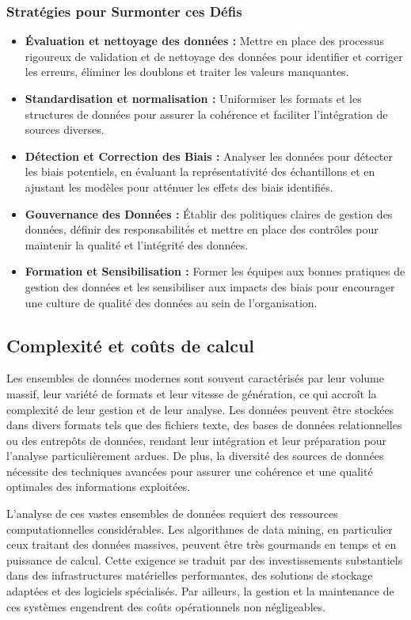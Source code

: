 \documentclass[a4paper,12pt]{article}
\begin{document}
		\subsubsection{Stratégies pour Surmonter ces Défis}
			\begin{itemize}
				\item \textbf{Évaluation et nettoyage des données :} Mettre en place des processus rigoureux de validation et de nettoyage des données pour identifier et corriger les erreurs, éliminer les doublons et traiter les valeurs manquantes. 
				\item \textbf{Standardisation et normalisation :} Uniformiser les formats et les structures de données pour assurer la cohérence et faciliter l'intégration de sources diverses. 
				\item \textbf{Détection et Correction des Biais :} Analyser les données pour détecter les biais potentiels, en évaluant la représentativité des échantillons et en ajustant les modèles pour atténuer les effets des biais identifiés. 
				\item \textbf{Gouvernance des Données :} Établir des politiques claires de gestion des données, définir des responsabilités et mettre en place des contrôles pour maintenir la qualité et l'intégrité des données. 
				\item \textbf{Formation et Sensibilisation :} Former les équipes aux bonnes pratiques de gestion des données et les sensibiliser aux impacts des biais pour encourager une culture de qualité des données au sein de l'organisation.
			\end{itemize}

	\subsection{Complexité et coûts de calcul}
		Les ensembles de données modernes sont souvent caractérisés par leur volume massif, leur variété de formats et leur vitesse de génération, ce qui accroît la complexité de leur gestion et de leur analyse. Les données peuvent être stockées dans divers formats tels que des fichiers texte, des bases de données relationnelles ou des entrepôts de données, rendant leur intégration et leur préparation pour l'analyse particulièrement ardues. De plus, la diversité des sources de données nécessite des techniques avancées pour assurer une cohérence et une qualité optimales des informations exploitées.

		L'analyse de ces vastes ensembles de données requiert des ressources computationnelles considérables. Les algorithmes de data mining, en particulier ceux traitant des données massives, peuvent être très gourmands en temps et en puissance de calcul. Cette exigence se traduit par des investissements substantiels dans des infrastructures matérielles performantes, des solutions de stockage adaptées et des logiciels spécialisés. Par ailleurs, la gestion et la maintenance de ces systèmes engendrent des coûts opérationnels non négligeables.
\end{document}
